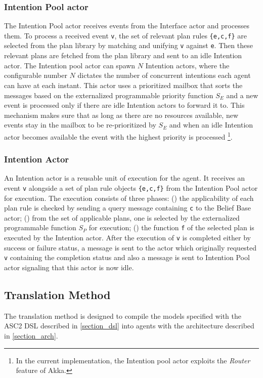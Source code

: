 \subsubsection{Intention Pool actor}
The Intention Pool actor receives events from the Interface actor and processes them. To process a received event \verb+v+, the set of relevant plan rules \verb+{e,c,f}+ are selected from the plan library by matching and unifying \verb+v+ against \verb+e+. Then these relevant plans are fetched from the plan library and sent to an idle Intention actor. The Intention pool actor can spawn $N$ Intention actors, where the configurable number $N$ dictates the number of concurrent intentions each agent can have at each instant. This actor uses a prioritized mailbox that sorts the messages based on the externalized programmable priority function $S_E$ and a new event is processed only if there are idle Intention actors to forward it to. This mechanism makes sure that as long as there are no resources available, new events stay in the mailbox to be re-prioritized by $S_E$ and when an idle Intention actor becomes available the event with the highest priority is processed \footnote{In the current implementation, the Intention pool actor exploits the \textit{Router} feature of Akka.}. %

\subsubsection{Intention Actor}
An Intention actor is a reusable unit of execution for the agent. It receives an event \verb+v+ alongside a set of plan rule objects \verb+{e,c,f}+ from the Intention Pool actor for execution. The execution consists of three phases: () the applicability of each plan rule is checked by sending a query message containing \verb+c+ to the Belief Base actor; () from the set of applicable plans, one is selected by the externalized programmable function $S_P$ for execution; () the function  \verb+f+ of the selected plan is executed by the Intention actor. After the execution of \verb+v+ is completed either by success or failure status, a message is sent to the actor which originally requested \verb+v+ containing the completion status and also a message is sent to Intention Pool actor signaling that this actor is now idle.


\subsection{Translation Method}
The translation method is designed to compile the models specified with the ASC2 DSL described in \ref{section_dsl} into agents with the architecture described in \ref{section_arch}. 

